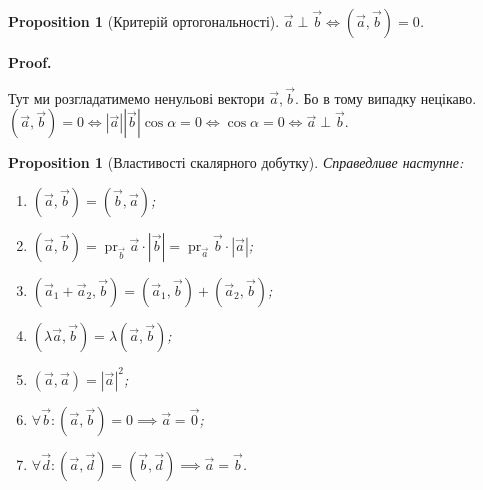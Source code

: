 \documentclass[a4paper, 10pt]{extarticle}
\makeatletter
\def\qed{$\blacksquare$}
\def\qed{$\blacksquare$}
\theoremstyle{theoremdd}
\theoremstyle{theoremdd}
\theoremstyle{theoremdd}
\theoremstyle{theoremdd}
\theoremstyle{theoremdd}
\newtheorem{proposition}[theorem]{Proposition}
\theoremstyle{theoremdd}
\theoremstyle{theoremdd}
\theoremstyle{theoremdd}
\renewenvironment{proof}[1][Proof.\\]{\par
\pushQED{\hfill \qed}%
\normalfont \topsep6\p@\@plus6\p@\relax
\trivlist
\item\relax
{\bfseries
#1\@addpunct{.}}\hspace\labelsep\ignorespaces
}{%
\popQED\endtrivlist\@endpefalse
}
\DeclareMathOperator{\pr}{pr}
\makeatother
\begin{document}
\begin{proposition}[Критерій ортогональності]
	$\vec{a} \perp \vec{b} \iff (\vec{a}, \vec{b}) = 0$.
\end{proposition}

\begin{proof}
Тут ми розгладатимемо ненульові вектори $\vec{a},\vec{b}$. Бо в тому випадку нецікаво.\\
	$(\vec{a}, \vec{b}) = 0 \iff |\vec{a}| |\vec{b}| \cos \alpha = 0 \iff \cos \alpha = 0 \iff \vec{a} \perp \vec{b}$.
\end{proof}

\begin{proposition}[Властивості скалярного добутку]
Справедливе наступне:
\begin{enumerate}[nosep,wide=0pt,label={\arabic*)}]
	\item $(\vec{a}, \vec{b}) = (\vec{b}, \vec{a})$;
	\item $(\vec{a}, \vec{b}) = \pr_{\vec{b}} \vec{a} \cdot |\vec{b}| = \pr_{\vec{a}} \vec{b} \cdot |\vec{a}|$;
	\item $(\vec{a}_1+\vec{a}_2, \vec{b}) = (\vec{a}_1, \vec{b}) + (\vec{a}_2, \vec{b})$;
	\item $(\lambda \vec{a}, \vec{b}) = \lambda (\vec{a}, \vec{b})$;
	\item $(\vec{a}, \vec{a}) = |\vec{a}|^2$;
	\item $\forall \vec{b}: (\vec{a}, \vec{b}) = 0 \implies \vec{a} = \vec{0}$;
	\item $\forall \vec{d}: (\vec{a}, \vec{d}) = (\vec{b}, \vec{d}) \implies \vec{a} = \vec{b}$.
\end{enumerate}
\end{proposition}
\end{document}

